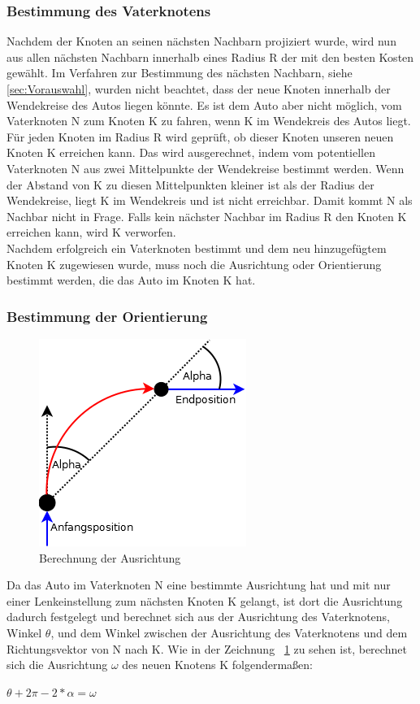 \subsubsection{Bestimmung des Vaterknotens}
Nachdem der Knoten an seinen nächsten Nachbarn projiziert wurde, wird nun aus allen nächsten Nachbarn innerhalb eines Radius R der mit den besten Kosten gewählt. Im Verfahren zur Bestimmung des nächsten Nachbarn, siehe \ref{sec:Vorauswahl}, wurden nicht beachtet, dass der neue Knoten innerhalb der Wendekreise des Autos liegen könnte. Es ist dem Auto aber nicht möglich, vom Vaterknoten N zum Knoten K zu fahren, wenn K im Wendekreis des Autos liegt. \\
Für jeden Knoten im Radius R wird geprüft, ob dieser Knoten unseren neuen Knoten K erreichen kann. Das wird ausgerechnet, indem vom potentiellen Vaterknoten N aus zwei Mittelpunkte der Wendekreise bestimmt werden. Wenn der Abstand von K zu diesen Mittelpunkten kleiner ist als der Radius der Wendekreise, liegt K im Wendekreis und ist nicht erreichbar. Damit kommt N als Nachbar nicht in Frage. Falls kein nächster Nachbar im Radius R den Knoten K erreichen kann, wird K verworfen. \\
Nachdem erfolgreich ein Vaterknoten bestimmt und dem neu hinzugefügtem Knoten K zugewiesen wurde, muss noch die Ausrichtung oder Orientierung bestimmt werden, die das Auto im Knoten K hat.
\subsubsection{Bestimmung der Orientierung}

\begin{figure}
\label{fig:fig8}
\centering
\includegraphics[scale=0.8]{Bilder/BerechnungOrientierung.png} 
\caption{Berechnung der Ausrichtung}
\end{figure}
Da das Auto im Vaterknoten N eine bestimmte Ausrichtung hat und mit nur einer Lenkeinstellung zum nächsten Knoten K gelangt, ist dort die Ausrichtung dadurch festgelegt und berechnet sich aus der Ausrichtung des Vaterknotens, Winkel $\theta$, und dem Winkel zwischen der Ausrichtung des Vaterknotens und dem Richtungsvektor von N nach K. Wie in der Zeichnung ~\ref{fig:fig8} zu sehen ist, berechnet sich die Ausrichtung $\omega$ des neuen Knotens K folgendermaßen:
\begin{center}
	$\theta + 2 \pi - 2*\alpha = \omega$
\end{center}

